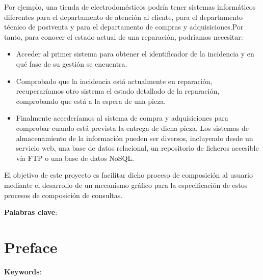 \documentclass[a4paper,12pt]{book}
\begin{document}
	Por ejemplo, una tienda de electrodomésticos podría tener sistemas informáticos diferentes para el departamento de atención al cliente, para el departamento técnico de postventa y para el departamento de compras y adquisiciones.Por tanto, para conocer el estado actual de una reparación, podríamos necesitar:
		\begin{itemize}
			\item  Acceder al primer sistema para obtener el identificador de la incidencia y en qué fase de su gestión se encuentra.
			\item  Comprobado que la incidencia está actualmente en reparación, recuperaríamos otro sistema el estado detallado de la reparación, comprobando que está a la espera de una pieza.
			\item Finalmente accederíamos al sistema de compra y adquisiciones para comprobar cuando está prevista la entrega de dicha pieza. Los sistemas de almacenamiento de la información pueden ser diversos, incluyendo desde un servicio web, una base de datos relacional, un repositorio de ficheros accesible vía FTP o una base de datos NoSQL.
		\end{itemize}
	
	\vspace{5mm}
	
	El objetivo de este proyecto es facilitar dicho proceso de composición al usuario mediante el desarrollo de un mecanismo gráfico para la especificación de estos procesos de composición de consultas.
	

	\vspace{5mm}
	
	\textbf{Palabras clave}: 
	\cleardoublepage
	
	\clearpage
	
	\chapter*{Preface}

	

	\textbf{Keywords}:
	\cleardoublepage
	
	\setcounter{page}{1}
	
	\clearpage
	
	
	
	\clearpage
	
	
	
	\clearpage
	
	
	
	\clearpage
	
	
	
	\clearpage
	
		
	
	\clearpage

	


	
	
	
	
\end{document}
